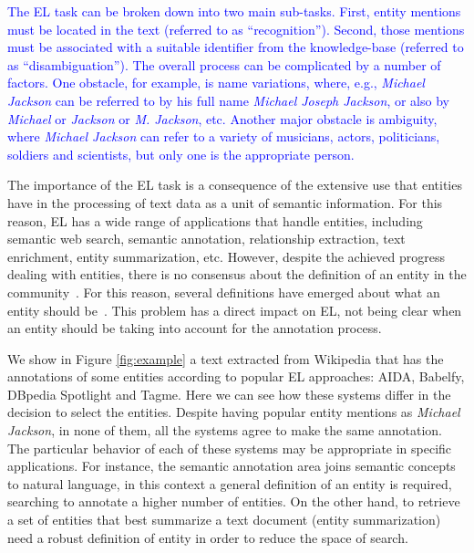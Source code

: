 \documentclass{llncs}
\begin{document}
\textcolor{blue}{The EL task can be broken down into two main sub-tasks. First, entity mentions must be located in the text (referred to as ``recognition''). Second, those mentions must be associated with a suitable identifier from the knowledge-base (referred to as ``disambiguation''). The overall process can be complicated by a number of factors. One obstacle, for example, is name variations, where, e.g., \textit{Michael Jackson} can be referred to by his full name \textit{Michael Joseph Jackson}, or also by \textit{Michael} or \textit{Jackson} or \textit{M. Jackson}, etc. Another major obstacle is ambiguity, where \textit{Michael Jackson} can refer to a variety of musicians, actors, politicians, soldiers and scientists, but only one is the appropriate person.}

The importance of the EL task is a consequence of the extensive use that entities have in the processing of text data as a unit of semantic information. For this reason, EL has a wide range of applications that handle entities, including semantic web search, semantic annotation, relationship extraction, text enrichment, entity summarization, etc. However, despite the achieved progress dealing with entities, there is no consensus about the definition of an entity in the community~\cite{Borrega007,Ling2015}. For this reason, several definitions have emerged about what an entity should be~\cite{MUC6,Eckhardt14,Uren06,Perera16}. This problem has a direct impact on EL, not being clear when an entity should be taking into account for the annotation process.

We show in Figure \ref{fig:example} a  text extracted from Wikipedia that has the annotations of some entities according to popular EL approaches: AIDA, Babelfy, DBpedia Spotlight and Tagme. Here we can see how these systems differ in the decision to select the entities. Despite having popular entity mentions as \textit{Michael Jackson}, in none of them, all the systems agree to make the same annotation. The particular behavior of each of these systems may be appropriate in specific applications. For instance, the semantic annotation area joins semantic concepts to natural language, in this context a general definition of an entity is required, searching to annotate a higher number of entities. On the other hand, to retrieve a set of entities that best summarize a text document (entity summarization) need a robust definition of entity in order to reduce the space of search.
\end{document}
